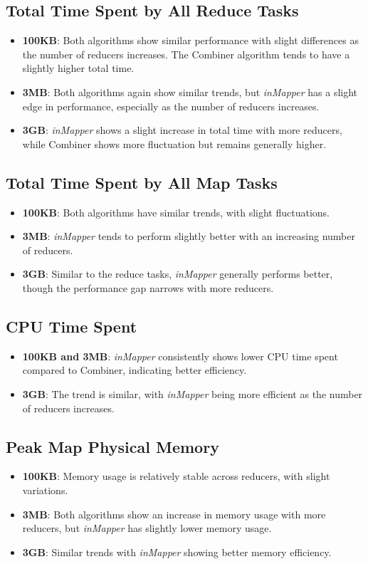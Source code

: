 \subsection{Total Time Spent by All Reduce Tasks}
\begin{itemize}
    \item \textbf{100KB}: Both algorithms show similar performance with slight differences as the number of reducers increases. The Combiner algorithm tends to have a slightly higher total time.
    \item \textbf{3MB}: Both algorithms again show similar trends, but \textit{inMapper} has a slight edge in performance, especially as the number of reducers increases.
    \item \textbf{3GB}: \textit{inMapper} shows a slight increase in total time with more reducers, while Combiner shows more fluctuation but remains generally higher.
\end{itemize}

\subsection{Total Time Spent by All Map Tasks}
\begin{itemize}
    \item \textbf{100KB}: Both algorithms have similar trends, with slight fluctuations.
    \item \textbf{3MB}: \textit{inMapper} tends to perform slightly better with an increasing number of reducers.
    \item \textbf{3GB}: Similar to the reduce tasks, \textit{inMapper} generally performs better, though the performance gap narrows with more reducers.
\end{itemize}

\subsection{CPU Time Spent}
\begin{itemize}
    \item \textbf{100KB and 3MB}: \textit{inMapper} consistently shows lower CPU time spent compared to Combiner, indicating better efficiency.
    \item \textbf{3GB}: The trend is similar, with \textit{inMapper} being more efficient as the number of reducers increases.
\end{itemize}

\subsection{Peak Map Physical Memory}
\begin{itemize}
    \item \textbf{100KB}: Memory usage is relatively stable across reducers, with slight variations.
    \item \textbf{3MB}: Both algorithms show an increase in memory usage with more reducers, but \textit{inMapper} has slightly lower memory usage.
    \item \textbf{3GB}: Similar trends with \textit{inMapper} showing better memory efficiency.
\end{itemize}

